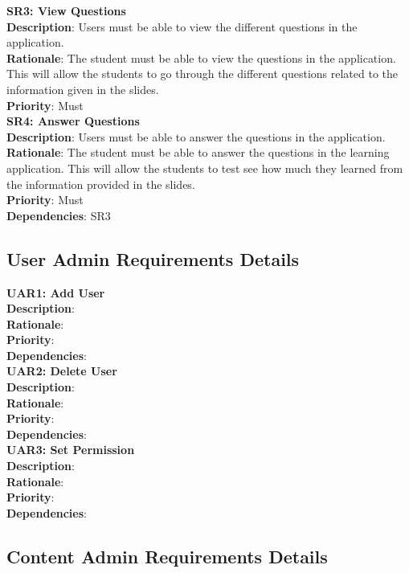 \documentclass{l3proj}
\begin{document}
\textbf{SR3: View Questions}\\
\textbf{Description}: Users must be able to view the different questions in the application. \\
\textbf{Rationale}: The student must be able to view the questions in the application. This will allow the students to go through the different questions related to the information given in the slides.\\
\textbf{Priority}: Must\\


\textbf{SR4: Answer Questions}\\
\textbf{Description}: Users must be able to answer the questions in the application.\\
\textbf{Rationale}: The student must be able to answer the questions in the learning application. This will allow the students to test see how much they learned from the information provided in the slides. \\
\textbf{Priority}: Must\\
\textbf{Dependencies}: SR3\\


\subsection{User Admin Requirements Details}

\textbf{UAR1: Add User} \\
\textbf{Description}: \\
\textbf{Rationale}: \\
\textbf{Priority}: \\
\textbf{Dependencies}:\\

\textbf{UAR2: Delete User} \\
\textbf{Description}:\\ 
\textbf{Rationale}: \\
\textbf{Priority}: \\
\textbf{Dependencies}:\\

\textbf{UAR3: Set Permission} \\
\textbf{Description}:\\ 
\textbf{Rationale}: \\
\textbf{Priority}: \\
\textbf{Dependencies}:\\

\subsection{Content Admin Requirements Details}
\end{document}
